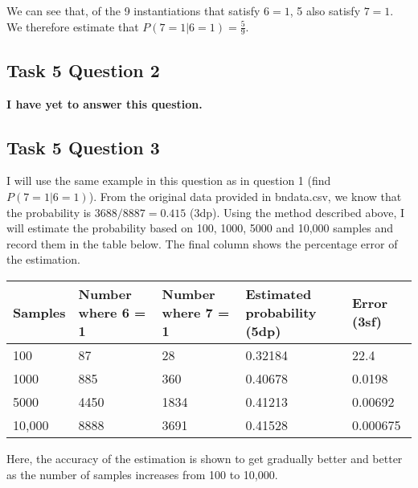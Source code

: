 \documentclass[a4paper,11pt]{article}
\begin{document}
We can see that, of the 9 instantiations that satisfy $6=1$, 5 also satisfy $7=1$.  We therefore estimate that $P(7=1|6=1) = \frac{5}{9}$.

\subsection{Task 5 Question 2}

\textbf{I have yet to answer this question.}

\subsection{Task 5 Question 3}

I will use the same example in this question as in question 1 (find $P(7=1|6=1)$).  From the original data provided in bndata.csv, we know that the probability is $3688 / 8887 = 0.415$ (3dp).  Using the method described above, I will estimate the probability based on 100, 1000, 5000 and 10,000 samples and record them in the table below.  The final column shows the percentage error of the estimation.

\begin{tabular}{l l l l l}
	Samples		& Number where 6 = 1	& Number where 7 = 1	& Estimated probability (5dp)		& Error (3sf) \\
	\hline
	100		& 87	& 28	& 0.32184		& 22.4 \\
	1000	& 885	& 360	& 0.40678		& 0.0198 \\
	5000	& 4450	& 1834	& 0.41213		& 0.00692 \\
	10,000	& 8888	& 3691	& 0.41528		& 0.000675
\end{tabular}

Here, the accuracy of the estimation is shown to get gradually better and better as the number of samples increases from 100 to 10,000.
\end{document}
